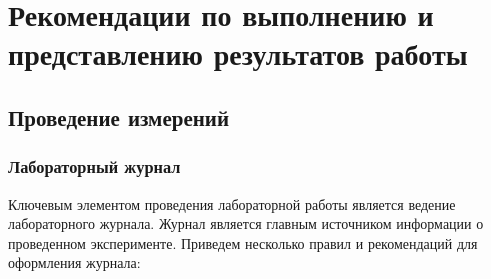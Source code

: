 \chapter{Рекомендации по выполнению и представлению результатов работы}

\section{Проведение измерений}

\subsection{Лабораторный журнал}
\label{sec:journal}

Ключевым элементом проведения лабораторной работы является ведение лабораторного журнала. Журнал является главным источником информации о проведенном эксперименте. Приведем несколько правил и рекомендаций для оформления журнала:

